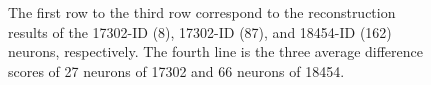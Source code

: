 \documentclass[runningheads]{llncs}
\begin{document}
\begin{figure}[htbp]
	
	

	\caption{The first row to the third row correspond to the reconstruction results of the 17302-ID (8), 17302-ID (87), and 18454-ID (162) neurons, respectively. The fourth line is the three average difference scores of 27 neurons of 17302 and 66 neurons of 18454.}
\end{figure}
\end{document}
